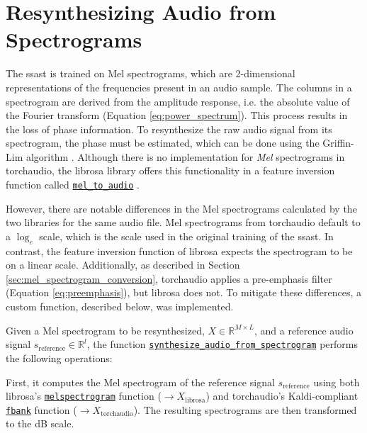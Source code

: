 

\chapter{Resynthesizing Audio from Spectrograms}
\label{appendix_resynth}





The \gls{ssast} is trained on Mel spectrograms, which are 2-dimensional representations of the frequencies present in an audio sample. The columns in a spectrogram are derived from the amplitude response, i.e. the absolute value of the Fourier transform (Equation \ref{eq:power_spectrum}). This process results in the loss of phase information. To resynthesize the raw audio signal from its spectrogram, the phase must be estimated, which can be done using the Griffin-Lim algorithm \cite{Griffin1983SignalEF}. Although there is no implementation for \textit{Mel} spectrograms in torchaudio, the librosa library offers this functionality in a feature inversion function called \href{https://librosa.org/doc/main/generated/librosa.feature.inverse.mel_to_audio.html}{\texttt{mel\_to\_audio}} \cite{McFee2015librosaAA}.

However, there are notable differences in the Mel spectrograms calculated by the two libraries for the same audio file. Mel spectrograms from torchaudio default to a $\log_e$ scale, which is the scale used in the original training of the \gls{ssast}. In contrast, the feature inversion function of librosa expects the spectrogram to be on a linear scale. Additionally, as described in Section \ref{sec:mel_spectrogram_conversion}, torchaudio applies a pre-emphasis filter (Equation \ref{eq:preemphasis}), but librosa does not. To mitigate these differences, a custom function, described below, was implemented.

Given a Mel spectrogram to be resynthesized, $X \in \mathbb{R}^{M \times L}$, and a reference audio signal $s_{\text{reference}} \in \mathbb{R}^l$, the function \href{https://github.com/Ironmomo/SpeakerVerificationBA/blob/master/plots_and_audios/audios_thesis.ipynb}{\texttt{synthesize\_audio\_from\_spectrogram}} performs the following operations:

First, it computes the Mel spectrogram of the reference signal $s_{\text{reference}}$ using both librosa's \href{https://librosa.org/doc/main/generated/librosa.feature.melspectrogram.html}{\texttt{melspectrogram}} function ($\rightarrow X_{\text{librosa}}$) and torchaudio's Kaldi-compliant \href{https://pytorch.org/audio/main/generated/torchaudio.compliance.kaldi.fbank.html}{\texttt{fbank}} function ($\rightarrow X_{\text{torchaudio}}$). The resulting spectrograms are then transformed to the dB scale.

